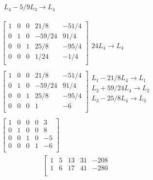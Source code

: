 \documentclass[]{article}
\begin{document}
\[\begin{array}{l}
\begin{array}{l}
\\ 
 L_{4} - 5/9 L_{3} \rightarrow L_{4} \\ 
\end{array}\\
 \\
\left[
\begin{array}{rrrr|r}
1 & 0 & 0 & 21/8 & -51/4 \\ 
0 & 1 & 0 & -59/24 & 91/4 \\ 
0 & 0 & 1 & 25/8 & -95/4 \\ 
0 & 0 & 0 & 1/24 & -1/4 \\ 
\end{array}
\right]\begin{array}{l}
\\ 
\\ 
\\ 
24 L_{4} \rightarrow L_{4}\\ 
\end{array}\\
 \\
\left[
\begin{array}{rrrr|r}
1 & 0 & 0 & 21/8 & -51/4 \\ 
0 & 1 & 0 & -59/24 & 91/4 \\ 
0 & 0 & 1 & 25/8 & -95/4 \\ 
0 & 0 & 0 & 1 & -6 \\ 
\end{array}
\right]\begin{array}{l}
 L_{1} - 21/8 L_{4} \rightarrow L_{1} \\ 
 L_{2} + 59/24 L_{4} \rightarrow L_{2} \\ 
 L_{3} - 25/8 L_{4} \rightarrow L_{3} \\ 
\\ 
\end{array}\\
 \\
\left[
\begin{array}{rrrr|r}
1 & 0 & 0 & 0 & 3 \\ 
0 & 1 & 0 & 0 & 8 \\ 
0 & 0 & 1 & 0 & -5 \\ 
0 & 0 & 0 & 1 & -6 \\ 
\end{array}
\right]
\end{array}
\]\[
\begin{array}{l}
\left[
\begin{array}{rrrr|r}
1 & 5 & 13 & 31 & -208 \\ 
1 & 6 & 17 & 41 & -280 \\ 

\end{array}
\end{array}\]
\end{document}
